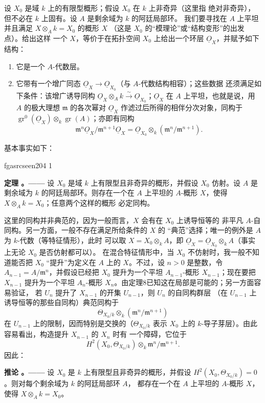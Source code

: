 \documentclass[12pt,twoside,openany]{book}
\numberwithin{equation}{section}
\newcommand{\fgaunitid}{unbound}
\newcommand{\src}[1]{%
  \phantomsection
  \hypertarget{src:\fgaunitid:#1}{}%
  \hypertarget{fga.\fgaunitid.p#1}{}%
  \ifcsname fgasrcseen#1\endcsname\else
    \expandafter\gdef\csname fgasrcseen#1\endcsname{1}%
    \hypertarget{src:#1}{}%
  \fi
  \marginpar{\raggedleft\footnotesize\sffamily #1}%
}
\newcommand{\Osh}{\underline{O}}
\newcommand{\fquote}[1]{“#1”}
\theoremstyle{plain}
\theoremstyle{definition}
\theoremstyle{remark}
\newcommand{\result}[2]{%
  \par\medskip\noindent\textbf{#1%
  \if\relax\detokenize{#2}\relax\else\space#2\fi。——}\enspace
}
\begin{document}
设 $X_0$ 是域 $k$ 上的有限型概形；假设 $X_0$ 在 $k$ 上非奇异（这里指
绝对非奇异），但不必在 $k$ 上固有。设 $A$ 是剩余域为 $k$ 的阿廷局部环。
我们要寻找在 $A$ 上平坦并且满足 $X\otimes_A k=X_0$ 的概形 $X$
（这是 $X_0$ 的\fquote{模理论}或\fquote{结构变形}的出发点）。给出这样
一个 $X$，等价于在拓扑空间 $X_0$ 上给出一个环层 $\Osh_X$，并赋予如下
结构：
\begin{enumerate}
  \item[\textit{i.}] 它是一个 $A$-代数层。
  \item[\textit{ii.}] 它带有一个增广同态
    $\Osh_X\longrightarrow\Osh_{X_0}$（与 $A$-代数结构相容）；这些数据
    还须满足如下条件：该增广诱导同构
    $\Osh_X\otimes_A k\xrightarrow{\sim}\Osh_{X_0}$；$\Osh_X$ 在 $A$
    上平坦，也就是说，用 $A$ 的极大理想 $\mathfrak m$ 的各次幂对
    $\Osh_X$ 作滤过后所得的相伴分次对象，同构于
    $\operatorname{gr}^0(\Osh_X)\otimes_k\operatorname{gr}(A)$；亦即有同构
    \[
      \mathfrak m^n\Osh_X/\mathfrak m^{n+1}\Osh_X
      =\Osh_{X_0}\otimes_k(\mathfrak m^n/\mathfrak m^{n+1}).
    \]
\end{enumerate}
基本事实如下：

\src{204}
\result{定理}{8} 设 $X_0$ 是域 $k$ 上有限型且非奇异的概形，并假设
$X_0$ 仿射。设 $A$ 是剩余域为 $k$ 的阿廷局部环。则存在一个在 $A$
上平坦的 $A$-概形 $X$，使得 $X\otimes_A k=X_0$；任意两个这样的概形
必定同构。

这里的同构并非典范的，因为一般而言，$X$ 会有在 $X_0$ 上诱导恒等的
非平凡 $A$-自同构。另一方面，一般不存在满足所给条件的 $X$ 的
\fquote{典范}选择；唯一的例外是 $A$ 为 $k$-代数（等特征情形），此时
可以取 $X=X_0\otimes_k A$，即
$\Osh_X=\Osh_{X_0}\otimes_k A$（事实上无论 $X_0$ 是否仿射都可以）。
在混合特征情形中，当 $X_0$ 不仿射时，我一般不知道能否把 $X_0$
\fquote{提升}为定义在 $A$ 上的 $X$。不过，设 $n>0$ 是整数，令
$A_{n-1}=A/\mathfrak m^n$，并假设已经把 $X_0$ 提升为一个平坦
$A_{n-1}$-概形 $X_{n-1}$；现在要把 $X_{n-1}$ 提升为一个平坦
$A_n$-概形 $X_n$。由定理8已知这在局部是可能的；另一方面容易验证，
若 $U_n$ 提升了 $X_{n-1}$ 的开集 $U_{n-1}$，则 $U_n$ 的自同构群层
（在 $U_{n-1}$ 上诱导恒等的那些自同构）典范同构于
\[
  \Theta_{X_0/k}\otimes_k(\mathfrak m^n/\mathfrak m^{n+1})
\]
在 $U_{n-1}$ 上的限制，因而特别是交换的（$\Theta_{X_0/k}$ 表示 $X_0$
上的 $k$-导子芽层）。由此容易看出，构造提升 $X_{n-1}$ 的 $X_n$ 时有
一个障碍，它位于
\[
  H^2(X_0,\Theta_{X_0/k})\otimes_k
  \mathfrak m^n/\mathfrak m^{n+1}.
\]
因此：

\result{推论}{1} 设 $X_0$ 是 $k$ 上有限型且非奇异的概形，并假设
$H^2(X_0,\Theta_{X_0/k})=0$。则对每个剩余域为 $k$ 的阿廷局部环 $A$，
都存在一个在 $A$ 上平坦的 $A$-概形 $X$，使得
$X\otimes_A k=X_0$。
\end{document}
